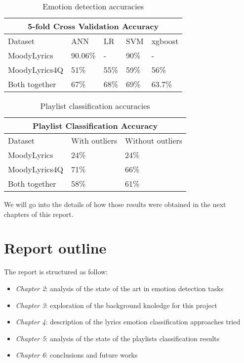 \begin{table}[H]
\centering
\begin{tabular}{ |p{3cm}||p{1.5cm}|p{1.5cm}|p{1.5cm}|p{1.5cm}|  }
 \hline
 \multicolumn{5}{|c|}{5-fold Cross Validation Accuracy} \\
 \hline
 Dataset & ANN & LR &SVM & xgboost\\
 \hline
MoodyLyrics  & 90.06\%    &- &  90\% & -\\
MoodyLyrics4Q  & 51\%    &55\% &  59\% & 56\%\\
Both together &   67\%  & 68\%   &69\% &63.7\%\\
\hline
\end{tabular}
\caption{Emotion detection accuracies} \label{tab:compar}
\end{table}

\begin{table}[H]
\centering
\begin{tabular}{ |p{3cm}||p{1.5cm}|p{1.5cm}| }
 \hline
 \multicolumn{3}{|c|}{Playlist Classification Accuracy} \\
 \hline
Dataset & With outliers & Without outliers\\
 \hline
MoodyLyrics & 24\% & 24\%\\
MoodyLyrics4Q  & 71\%    &66\%\\
Both together &   58\%  & 61\%\\
\hline
\end{tabular}
\caption{Playlist classification accuracies} \label{tab:compar2}
\end{table}

We will go into the details of how those results were obtained in the next chapters of this report.

\section{Report outline}
The report is structured as follow: 
\begin{itemize}
\item \textit{Chapter 2}: analysis of the state of the art in emotion detection tasks
\item \textit{Chapter 3}: exploration of the background knoledge for this project
\item \textit{Chapter 4}: description of the lyrics emotion classification approaches tried
\item \textit{Chapter 5}: analysis of the state of the playlists classification results
\item \textit{Chapter 6}: conclusions and future works
\end{itemize}











